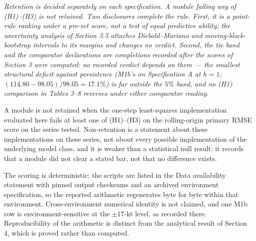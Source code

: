 \documentclass[11pt]{article}
\begin{document}
\emph{Retention is decided separately on each specification. A module
failing any of (H1)--(H3) is not retained. Two disclosures complete the
rule. First, it is a point-rule ranking under a pre-set score, not a
test of equal predictive ability; the uncertainty analysis of
Section 3.5 attaches Diebold--Mariano and moving-block-bootstrap
intervals to its margins and changes no verdict. Second, the tie band
and the comparator declarations are completions recorded after the
scores of Section 3 were computed: no recorded verdict depends on them
--- the smallest structural deficit against persistence (M1b's on
Specification A at \(h=1\); \((114.80-98.05)/98.05 = 17.1\%\)) is far
outside the \(5\%\) band, and no (H1) comparison in Tables
3--8 reverses under either comparator reading.}

A module is not retained when the one-step least-squares implementation
evaluated here fails at least one of (H1)--(H3) on the rolling-origin
primary RMSE score on the series tested. Non-retention is a statement
about these implementations on these series, not about every possible
implementation of the underlying model class, and it is weaker than a
statistical null result: it records that a module did not clear a stated
bar, not that no difference exists.

The scoring is deterministic: the scripts are listed in the Data
availability statement with pinned output checksums and an archived
environment specification, so the reported arithmetic regenerates byte
for byte within that environment. Cross-environment numerical
identity is not claimed, and one M1b row is environment-sensitive at
the \(\pm 17\)-kt level, as recorded there.
Reproducibility of the arithmetic is distinct from the analytical result
of Section 4, which is proved rather than computed.
\end{document}
